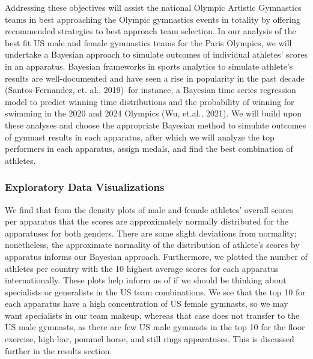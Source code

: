 \documentclass[
  10.5pt,
  letterpaper,
  DIV=11,
  numbers=noendperiod]{scrartcl}
\begin{document}
Addressing these objectives will assist the national Olympic Artistic
Gymnastics teams in best approaching the Olympic gymnastics events in
totality by offering recommended strategies to best approach team
selection. In our analysis of the best fit US male and female gymnastics
teams for the Paris Olympics, we will undertake a Bayesian approach to
simulate outcomes of individual athletes' scores in an apparatus.
Bayesian frameworks in sports analytics to simulate athlete's results
are well-documented and have seen a rise in popularity in the past
decade (Santos-Fernandez, et. al., 2019)--for instance, a Bayesian time
series regression model to predict winning time distributions and the
probability of winning for swimming in the 2020 and 2024 Olympics (Wu,
et.al., 2021). We will build upon these analyses and choose the
appropriate Bayesian method to simulate outcomes of gymnast results in
each apparatus, after which we will analyze the top performers in each
apparatus, assign medals, and find the best combination of athletes.

\hypertarget{exploratory-data-visualizations}{%
\subsubsection{Exploratory Data
Visualizations}\label{exploratory-data-visualizations}}

We find that from the density plots of male and female athletes' overall
scores per apparatus that the scores are approximately normally
distributed for the apparatuses for both genders. There are some slight
deviations from normality; nonetheless, the approximate normality of the
distribution of athlete's scores by apparatus informs our Bayesian
approach. Furthermore, we plotted the number of athletes per country
with the 10 highest average scores for each apparatus internationally.
These plots help inform us of if we should be thinking about specialists
or generalists in the US team combinations. We see that the top 10 for
each apparatus have a high concentration of US female gymnasts, so we
may want specialists in our team makeup, whereas that case does not
transfer to the US male gymnasts, as there are few US male gymnasts in
the top 10 for the floor exercise, high bar, pommel horse, and still
rings apparatuses. This is discussed further in the results section.
\end{document}
